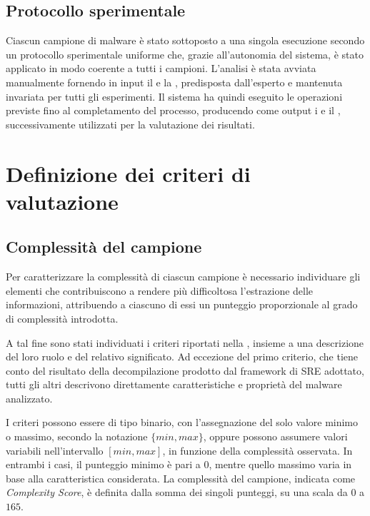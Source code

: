 \subsection{Protocollo sperimentale} %

Ciascun campione di malware è stato sottoposto a una singola esecuzione secondo un protocollo sperimentale uniforme che, grazie all'autonomia del sistema, è stato applicato in modo coerente a tutti i campioni. L'analisi è stata avviata manualmente fornendo in input il \binary{} e la \kb{}, predisposta dall'esperto e mantenuta invariata per tutti gli esperimenti. Il sistema ha quindi eseguito le operazioni previste fino al completamento del processo, producendo come output i \report{} e il \capture{}, successivamente utilizzati per la valutazione dei risultati.

\section{Definizione dei criteri di valutazione} %

\subsection{Complessità del campione} %

Per caratterizzare la complessità di ciascun campione è necessario individuare gli elementi che contribuiscono a rendere più difficoltosa l'estrazione delle informazioni, attribuendo a ciascuno di essi un punteggio proporzionale al grado di complessità introdotta.

A tal fine sono stati individuati i criteri riportati nella , insieme a una descrizione del loro ruolo e del relativo significato. Ad eccezione del primo criterio, che tiene conto del risultato della decompilazione prodotto dal framework di SRE adottato, tutti gli altri descrivono direttamente caratteristiche e proprietà del malware analizzato. %

I criteri possono essere di tipo binario, con l'assegnazione del solo valore minimo o massimo, secondo la notazione \(\{min,max\}\), oppure possono assumere valori variabili nell'intervallo \([min,max]\), in funzione della complessità osservata. In entrambi i casi, il punteggio minimo è pari a $0$, mentre quello massimo varia in base alla caratteristica considerata. La complessità del campione, indicata come \emph{Complexity Score}, è definita dalla somma dei singoli punteggi, su una scala da $0$ a $165$.

